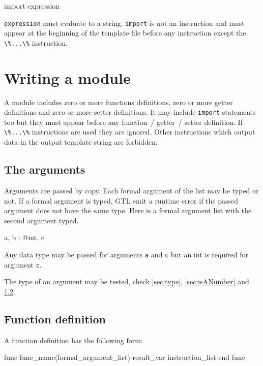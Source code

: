 \documentclass[10pt,openright,twosides]{report}
\newcommand{\gtltype}[1]{{\small\ttfamily #1}}
\newcommand{\gtlinline}[1]{\colorbox{light-blue}{\lstinline[language=gtl]{#1}}}
\begin{document}
\begin{gtl}
import expression
\end{gtl}

\gtlinline{expression} must evaluate to a \gtltype{string}. \gtlinline{import} is not an instruction and must appear at the beginning of the template file before any instruction except the \gtlinline{\%...\%} instruction.

\section{Writing a module}

A module includes zero or more functions definitions, zero or more getter definitions and zero or more setter definitions. It may include \gtlinline{import} statements too but they must appear before any function~/ getter~/ setter definition. If  \gtlinline{\%...\%} instructions are used they are ignored. Other instructions which output data in the output template string are forbidden.

\subsection{The arguments}

Arguments are passed by copy. Each formal argument of the list may be typed or not. If a formal argument is typed, GTL emit a runtime error if the passed argument does not have the same type. Here is a formal argument list with the second argument typed.

\begin{gtl}
a, b : @int, c
\end{gtl}

Any data type may be passed for arguments \gtlinline{a} and \gtlinline{c} but an \gtltype{int} is required for argument \gtlinline{c}.

The type of an argument may be tested, check \ref{sec:type}, \ref{sec:isANumber} and \ref{sec:function}.

\subsection{Function definition}
\label{sec:function}

A function definition has the following form:

\begin{gtl}
func func_name(formal_argument_list) result_var
  instruction_list
end func
\end{gtl}
\end{document}
